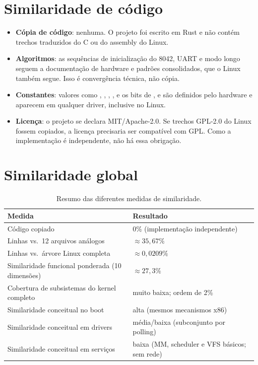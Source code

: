 \section{Similaridade de c\'odigo}

\begin{itemize}
  \item \textbf{C\'opia de c\'odigo}: nenhuma. O projeto foi escrito em Rust
        e n\~ao cont\'em trechos traduzidos do C ou do assembly do Linux.
  \item \textbf{Algoritmos}: as sequ\^encias de inicializa\c{c}\~ao do 8042,
        UART e modo longo seguem a documenta\c{c}\~ao de hardware e padr\~oes
        consolidados, que o Linux tamb\'em segue. Isso \'e converg\^encia
        t\'ecnica, n\~ao c\'opia.
  \item \textbf{Constantes}: valores como , ,
        , ,  e os bits de ,
         e  s\~ao definidos pelo hardware e aparecem em
        qualquer driver, inclusive no Linux.
  \item \textbf{Licen\c{c}a}: o projeto se declara MIT/Apache-2.0. Se
        trechos GPL-2.0 do Linux fossem copiados, a licen\c{c}a precisaria
        ser compat\'ivel com GPL. Como a implementa\c{c}\~ao \'e
        independente, n\~ao h\'a essa obriga\c{c}\~ao.
\end{itemize}

\section{Similaridade global}

\begin{table}[H]
\centering
\caption{Resumo das diferentes medidas de similaridade.}
\label{tab:resumo-similaridade}
\begin{tabularx}{\linewidth}{@{}lX@{}}
\toprule
\textbf{Medida} & \textbf{Resultado} \\
\midrule
C\'odigo copiado & 0\% (implementa\c{c}\~ao independente) \\
Linhas vs.\ 12 arquivos an\'alogos & $\approx 35{,}67\%$ \\
Linhas vs.\ \'arvore Linux completa & $\approx 0{,}0209\%$ \\
Similaridade funcional ponderada (10 dimens\~oes) & $\approx 27{,}3\%$ \\
Cobertura de subsistemas do kernel completo & muito baixa; ordem de 2\% \\
Similaridade conceitual no boot & alta (mesmos mecanismos x86) \\
Similaridade conceitual em drivers & m\'edia/baixa (subconjunto por polling) \\
Similaridade conceitual em servi\c{c}os & baixa (MM, scheduler e VFS b\'asicos; sem rede) \\
\bottomrule
\end{tabularx}
\end{table}

